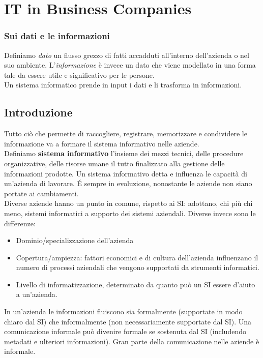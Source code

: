 \chapter{IT in Business Companies}
\subsection{Sui dati e le informazioni}
Definiamo \textit{dato} un flusso grezzo di fatti accadduti all'interno dell'azienda o nel suo ambiente.
L'\textit{informazione} \`e invece un dato che viene modellato in una forma tale da essere utile e significativo per le persone.\\
Un sistema informatico prende in input i dati e li trasforma in informazioni.

\section{Introduzione}
Tutto ci\`o che permette di raccogliere, registrare, memorizzare e condividere le informazione va a formare il sistema informativo nelle aziende.\\
Definiamo \textbf{sistema informativo} l'insieme dei mezzi tecnici, delle procedure organizzative, delle risorse umane il tutto finalizzato alla gestione delle informazioni prodotte.
Un sistema informativo detta e influenza le capacit\`a di un'azienda di lavorare.
\'E sempre in evoluzione, nonostante le aziende non siano portate ai cambiamenti.\\


Diverse aziende hanno un punto in comune, rispetto ai SI: adottano, chi pi\`u chi meno, sistemi informatici a supporto dei sistemi aziendali.
Diverse invece sono le differenze:
\begin{itemize}
\item Dominio/specializzazione dell'azienda
\item Copertura/ampiezza: fattori economici e di cultura dell'azienda influenzano il numero di processi aziendali che vengono supportati da strumenti informatici.
\item Livello di informatizzazione, determinato da quanto pu\`o un SI essere d'aiuto a un'azienda.
\end{itemize}

In un'azienda le informazioni fluiscono sia formalmente (supportate in modo chiaro dal SI) che informalmente (non necessariamente supportate dal SI). Una comunicazione informale pu\`o divenire formale se sostenuta dal SI (includendo metadati e ulteriori informazioni). Gran parte della comunicazione nelle aziende \`e informale.

